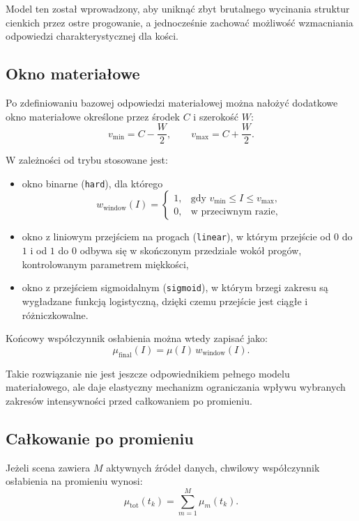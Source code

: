 \documentclass[11pt,a4paper]{article}
\begin{document}
Model ten został wprowadzony, aby uniknąć zbyt brutalnego wycinania struktur cienkich
przez ostre progowanie, a jednocześnie zachować możliwość wzmacniania odpowiedzi
charakterystycznej dla kości.

\subsection{Okno materiałowe}

Po zdefiniowaniu bazowej odpowiedzi materiałowej można nałożyć dodatkowe okno
materiałowe określone przez środek \(C\) i szerokość \(W\):
\[
  v_{\min}=C-\frac{W}{2},
  \qquad
  v_{\max}=C+\frac{W}{2}.
\]

W zależności od trybu stosowane jest:
\begin{itemize}
\item okno binarne (\texttt{hard}), dla którego
      \[
        w_{\mathrm{window}}(I)=
        \begin{cases}
          1, & \text{gdy } v_{\min}\le I \le v_{\max},\\
          0, & \text{w przeciwnym razie,}
        \end{cases}
      \]
\item okno z liniowym przejściem na progach (\texttt{linear}), w którym
      przejście od \(0\) do \(1\) i od \(1\) do \(0\) odbywa się w skończonym
      przedziale wokół progów, kontrolowanym parametrem miękkości,
\item okno z przejściem sigmoidalnym (\texttt{sigmoid}), w którym brzegi zakresu
      są wygładzane funkcją logistyczną, dzięki czemu przejście jest ciągłe
      i różniczkowalne.
\end{itemize}

Końcowy współczynnik osłabienia można wtedy zapisać jako:
\[
  \mu_{\mathrm{final}}(I)=\mu(I)\,w_{\mathrm{window}}(I).
\]

Takie rozwiązanie nie jest jeszcze odpowiednikiem pełnego modelu materiałowego,
ale daje elastyczny mechanizm ograniczania wpływu wybranych zakresów intensywności
przed całkowaniem po promieniu.

\subsection{Całkowanie po promieniu}

Jeżeli scena zawiera \(M\) aktywnych źródeł danych, chwilowy współczynnik osłabienia
na promieniu wynosi:
\[
  \mu_{\mathrm{tot}}(t_k)=\sum_{m=1}^{M}\mu_m(t_k).
\]
\end{document}
